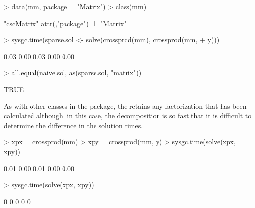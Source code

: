 \documentclass{article}
\begin{document}
\begin{Schunk}
\begin{Sinput}
> data(mm, package = "Matrix")
> class(mm)
\end{Sinput}
\begin{Soutput}
[1] "cscMatrix"
attr(,"package")
[1] "Matrix"
\end{Soutput}
\begin{Sinput}
> sysgc.time(sparse.sol <- solve(crossprod(mm), crossprod(mm, 
+     y)))
\end{Sinput}
\begin{Soutput}
[1] 0.03 0.00 0.03 0.00 0.00
\end{Soutput}
\begin{Sinput}
> all.equal(naive.sol, as(sparse.sol, "matrix"))
\end{Sinput}
\begin{Soutput}
[1] TRUE
\end{Soutput}
\end{Schunk}

As with other classes in the  package, the
 retains any factorization that has been calculated
although, in this case, the decomposition is so fast that it is
difficult to determine the difference in the solution times.

\begin{Schunk}
\begin{Sinput}
> xpx = crossprod(mm)
> xpy = crossprod(mm, y)
> sysgc.time(solve(xpx, xpy))
\end{Sinput}
\begin{Soutput}
[1] 0.01 0.00 0.01 0.00 0.00
\end{Soutput}
\begin{Sinput}
> sysgc.time(solve(xpx, xpy))
\end{Sinput}
\begin{Soutput}
[1] 0 0 0 0 0
\end{Soutput}
\end{Schunk}


\end{document}
